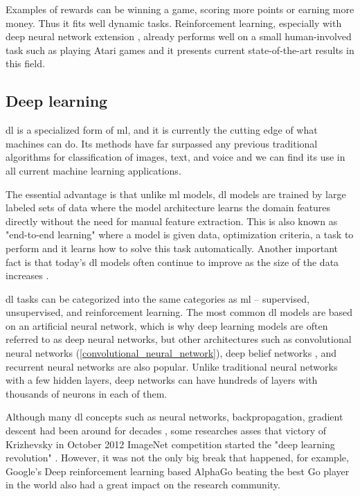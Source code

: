             Examples of rewards can be winning a game, scoring more points or earning more money. Thus it fits well dynamic tasks. Reinforcement learning, especially with deep neural network extension \cite{franccois2018introduction}, already performs well on a small human-involved task such as playing Atari games and it presents current state-of-the-art results in this field.
       
    \subsection{Deep learning}
        \Gls{dl} \cite{goodfellow2016deep} is a specialized form of \gls{ml}, and it is currently the cutting edge of what machines can do. Its methods have far surpassed any previous traditional algorithms for classification of images, text, and voice and we can find its use in all current machine learning applications. 
        
        The essential advantage is that unlike \gls{ml} models, \Gls{dl} models are trained by large labeled sets of data where the model architecture learns the domain features directly without the need for manual feature extraction. This is also known as "end-to-end learning" where a model is given data, optimization criteria, a task to perform and it learns how to solve this task automatically. Another important fact is that today's \gls{dl} models often continue to improve as the size of the data increases \cite{lecun2015deep}.
        
        \Gls{dl} tasks can be categorized into the same categories as \gls{ml} -- supervised, unsupervised, and reinforcement learning. The most common \gls{dl} models are based on an artificial neural network, which is why deep learning models are often referred to as deep neural networks, but other architectures such as convolutional neural networks (\ref{convolutional_neural_network}), deep belief networks \cite{lee2009convolutional}, and recurrent neural networks \cite{mikolov2010recurrent} are also popular. Unlike traditional neural networks with a few hidden layers, deep networks can have hundreds of layers with thousands of neurons in each of them.
        
        Although many \gls{dl} concepts such as neural networks, backpropagation, gradient descent had been around for decades \cite{fukushima1980neocognitron, lecun1989backpropagation, lecun1998gradient}, some researches asses that victory of Krizhevsky in October 2012 ImageNet competition started the "deep learning revolution" \cite{russakovsky2015imagenet}. However, it was not the only big break that happened, for example, Google’s Deep reinforcement learning based AlphaGo beating the best Go player in the world \cite{kochgo} also had a great impact on the research community. 
        
